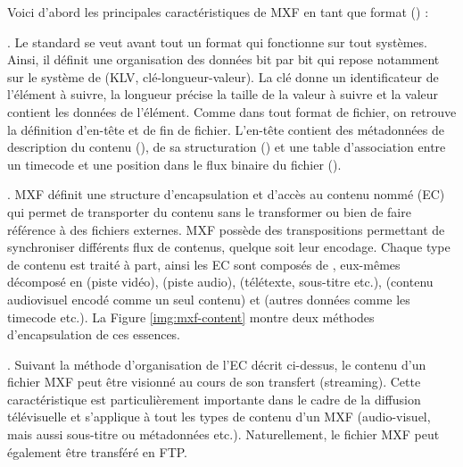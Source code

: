 Voici d'abord les principales caractéristiques de MXF en tant que format (\cite{Ferreira2010a}) : 
\begin{liste} 
	\item {}. 
	Le standard se veut avant tout un format qui fonctionne sur tout systèmes. 
	Ainsi, il définit une organisation des données bit par bit qui repose notamment sur le système de  (KLV, clé-longueur-valeur). 
	La clé donne un identificateur de l'élément à suivre, la longueur précise la taille de la valeur à suivre et la valeur contient les données de l'élément.
	Comme dans tout format de fichier, on retrouve la définition d'en-tête et de fin de fichier. 
	L'en-tête contient des métadonnées de description du contenu (), de sa structuration () et une table d'association entre un timecode et une position dans le flux binaire du fichier ().

	\item {}.
	MXF définit une structure d'encapsulation et d'accès au contenu nommé  (EC) qui permet de transporter du contenu sans le transformer ou bien de faire référence à des fichiers externes.  
	MXF possède des transpositions permettant de synchroniser différents flux de contenus, quelque soit leur encodage. 
	Chaque type de contenu est traité à part, ainsi les EC sont composés de , eux-mêmes décomposé en  (piste vidéo),  (piste audio),  (télétexte, sous-titre etc.),  (contenu audiovisuel encodé comme un seul contenu) et  (autres données comme les timecode etc.).
	La Figure \ref{img:mxf-content} montre deux méthodes d'encapsulation de ces essences.


	\item {}. 
	Suivant la méthode d'organisation de l'EC décrit ci-dessus, le contenu d'un fichier MXF peut être visionné au cours de son transfert (streaming). 
	Cette caractéristique est particulièrement importante dans le cadre de la diffusion télévisuelle et s'applique à tout les types de contenu d'un MXF (audio-visuel, mais aussi sous-titre ou métadonnées etc.). 
	Naturellement, le fichier MXF peut également être transféré en FTP.


\end{liste}

